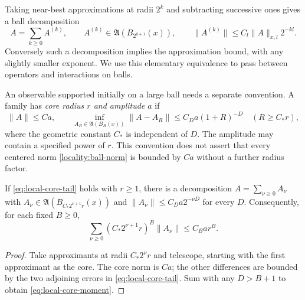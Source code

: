 Taking near-best approximations at radii $2^k$ and subtracting successive
ones gives a ball decomposition
\begin{equation}
 A=\sum_{k\geq0}A^{(k)},\qquad
 A^{(k)}\in\mathfrak A(B_{2^{k+1}}(x)),\qquad
 \|A^{(k)}\|\leq C_l\|A\|_{x,l}2^{-kl}.
 \label{eq:ball-decomposition}
\end{equation}
Conversely such a decomposition implies the approximation bound, with
any slightly smaller exponent.  We use this elementary equivalence
to pass between operators and interactions on balls.

An observable supported initially on a large ball needs a separate
convention.  A family has \emph{core radius $r$ and amplitude $a$} if
\begin{equation}
 \|A\|\leq Ca,\qquad
 \inf_{A_R\in\mathfrak A(B_R(x))}\|A-A_R\|
       \leq C_Da(1+R)^{-D}\quad(R\geq C_*r),
 \label{eq:local-core-tail}
\end{equation}
where the geometric constant $C_*$ is independent of $D$.
The amplitude may contain a specified power of $r$.  This convention
does not assert that every centered norm \eqref{locality:ball-norm}
is bounded by $Ca$ without a further radius factor.

\begin{lemma}\label{locality:core-shells}
If \eqref{eq:local-core-tail} holds with $r\geq1$, there is a
decomposition $A=\sum_{\nu\geq0}A_\nu$ with
$A_\nu\in\mathfrak A(B_{C_*2^{\nu+1}r}(x))$ and
$\|A_\nu\|\leq C_Da2^{-\nu D}$ for every $D$.
Consequently, for each fixed $B\geq0$,
\begin{equation}
 \sum_{\nu\geq0}(C_*2^{\nu+1}r)^B\|A_\nu\|
       \leq C_Ba r^B.
 \label{eq:local-core-moment}
\end{equation}
\end{lemma}

\begin{proof}
Take approximants at radii $C_*2^\nu r$ and telescope, starting
with the first approximant as the core.  The core norm is $Ca$;
the other differences are bounded by the two adjoining errors in
\eqref{eq:local-core-tail}.  Sum with any $D>B+1$ to obtain
\eqref{eq:local-core-moment}.
\end{proof}

